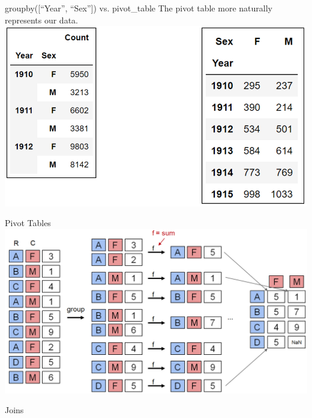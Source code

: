 \documentclass[aspectratio=169]{../latex_main/tntbeamer}  %
\begin{document}
    \begin{frame}{groupby([“Year”, “Sex”]) vs. pivot\_table}
     The pivot table more naturally represents our data.\\
        \centering
       \includegraphics[scale=.35]{Bild39}
    \end{frame}
    
    
    
    \begin{frame}{Pivot Tables}
        \centering
       \includegraphics[scale=.35]{Bild40}
    \end{frame}
    
    
    
    \begin{frame}{Joins}

    \end{frame}
    
\end{document}
